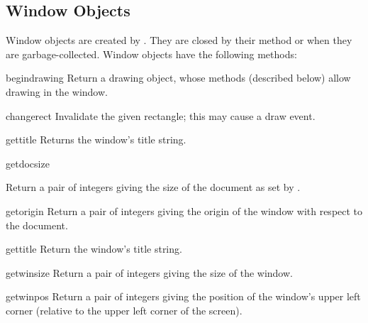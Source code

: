 \subsection{Window Objects}

Window objects are created by .  They are closed
by their  method or when they are garbage-collected.
Window objects have the following methods:

\begin{methoddesc}[window]{begindrawing}{}
Return a drawing object, whose methods (described below) allow drawing
in the window.
\end{methoddesc}

\begin{methoddesc}[window]{change}{rect}
Invalidate the given rectangle; this may cause a draw event.
\end{methoddesc}

\begin{methoddesc}[window]{gettitle}{}
Returns the window's title string.
\end{methoddesc}

\begin{methoddesc}[window]{getdocsize}{}
\begin{sloppypar}
Return a pair of integers giving the size of the document as set by
.
\end{sloppypar}
\end{methoddesc}

\begin{methoddesc}[window]{getorigin}{}
Return a pair of integers giving the origin of the window with respect
to the document.
\end{methoddesc}

\begin{methoddesc}[window]{gettitle}{}
Return the window's title string.
\end{methoddesc}

\begin{methoddesc}[window]{getwinsize}{}
Return a pair of integers giving the size of the window.
\end{methoddesc}

\begin{methoddesc}[window]{getwinpos}{}
Return a pair of integers giving the position of the window's upper
left corner (relative to the upper left corner of the screen).
\end{methoddesc}


